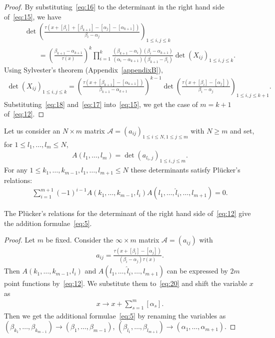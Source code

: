 \documentclass[pdftex]{sigma}
\begin{document}
\begin{proof}
By substituting~\eqref{eq:16} to the determinant in the right hand side of~\eqref{eq:15}, we have
\begin{gather}
\det\left(\frac{\tau(x+[\beta_i]+[\beta_{k+1}]-[\alpha_j]-[\alpha_{k+1}])}{\beta_i-\alpha_j}
\right)_{1\le i,j\le k}\nonumber
\\
\qquad
{}=\left(\frac{\beta_{k+1}-\alpha_{k+1}}{\tau(x)}\right)^k\prod_{i=1}^{k}\frac{(\beta_{k+1}
-\alpha_i)(\beta_i-\alpha_{k+1})}{(\alpha_i-\alpha_{k+1})(\beta_{k+1}-\beta_i)}\det(X_{ij})_{1\le i,j\le k}.
\label{eq:17}
\end{gather}
Using Sylvester's theorem (Appendix~\ref{appendixB}),
\begin{gather}
\det(X_{ij})_{1\le i,j\le k}=\left(\frac{\tau(x+[\beta_{k+1}]-[\alpha_{k+1}])}{\beta_{k+1}-\alpha_{k+1}}
\right)^{k-1}\det\left(\frac{\tau(x+[\beta_i]-[\alpha_j])}{\beta_i-\alpha_j}\right)_{1\le i,j\le k+1}.
\label{eq:18}
\end{gather}
Substituting~\eqref{eq:18} and~\eqref{eq:17} into~\eqref{eq:15}, we get the case of $m=k+1$
of~\eqref{eq:12}.
\end{proof}

Let us consider an $N\times m$ matrix ${\mathcal A} =(a_{ij})_{1\le i\le N,1\le j\le m}$ with $N\ge m$ and
set, for $1\le l_1,\dots,l_m\le N$,
\begin{gather*}
A(l_1,\dots,l_m)=\det(a_{{l_i},j})_{1\le i,j\le m}.
\end{gather*}
For any $1\le k_1,\dots,k_{m-1},l_1,\dots,l_{m+1}\le N$ these determinants satisfy Pl\"{u}cker's
relations:
\begin{gather}
\sum_{i=1}^{m+1}(-1)^{i-1}A(k_1,\dots,k_{m-1},l_i)A(l_1,\dots,{\hat l}_i,\dots,l_{m+1})=0.
\label{eq:20}
\end{gather}
\begin{proposition}\label{proposition3}
The Pl\"{u}cker's relations for the determinant of the right hand side of~\eqref{eq:12} give the addition
formulae~\eqref{eq:5}.
\end{proposition}
\begin{proof}
Let $m$ be f\/ixed.
Consider the $\infty\times m$ matrix ${\mathcal A}=(a_{ij})$ with
\begin{gather*}
a_{ij}=\frac{\tau(x+[\beta_i]-[\alpha_j])}{(\beta_i-\alpha_j)\tau(x)}.
\end{gather*}
Then $A(k_1,\dots,k_{m-1},l_i)$ and $A(l_1,\dots,{\hat l}_i,\dots,l_{m+1})$ can be expressed by $2m$ point
functions by~\eqref{eq:12}.
We substitute them to~\eqref{eq:20} and shift the variable $x$ as
\begin{gather*}
x\rightarrow x+\sum_{s=1}^m[\alpha_s].
\end{gather*}
Then we get the additional %
formulae~\eqref{eq:5} by renaming the variables as
$(\beta_{k_1},\dots,\beta_{k_{m-1}})\rightarrow(\beta_1,\dots,\beta_{m-1})$,
$(\beta_{l_1},\dots,\beta_{l_{m+1}})\rightarrow(\alpha_1,\dots,\alpha_{m+1})$.
\end{proof}
\end{document}
